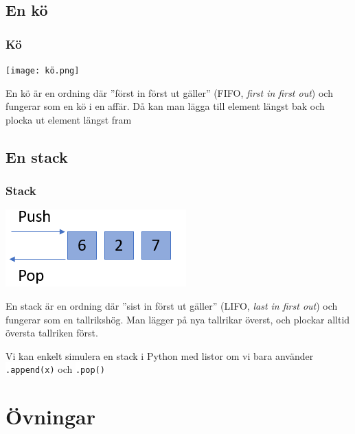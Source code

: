 \documentclass[aspectratio=169]{beamer}
\newcommand{\code}[1]{\colorbox{white}{\lstinline{#1}}}
\begin{document}
\subsection{En kö}

\begin{frame}
	\frametitle{Kö}
	
	\begin{center}
		\texttt{[image: kö.png]}
	\end{center}
	
	En kö är en ordning där ''först in först ut gäller'' (FIFO, \textit{first in first out}) och fungerar som en kö i en affär. Då kan man lägga till element längst bak och plocka ut element längst fram
	
\end{frame}

\subsection{En stack}

\begin{frame}
	\frametitle{Stack}
	
	\begin{center}
		\includegraphics{stack.png}
	\end{center}
	
	En stack är en ordning där ''sist in först ut gäller'' (LIFO, \textit{last in first out}) och fungerar som en tallrikshög. Man lägger på nya tallrikar överst, och plockar alltid översta tallriken först.
	
	Vi kan enkelt simulera en stack i Python med listor om vi bara använder \code{.append(x)} och \code{.pop()}
	
\end{frame}


\section{Övningar}
\end{document}
